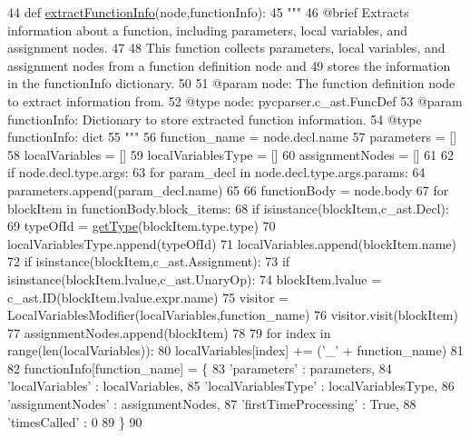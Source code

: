 \begin{DoxyCode}
44 \textcolor{keyword}{def }\hyperlink{namespaceutils_a01c8b36149daaab35946bf42cf90fcc1}{extractFunctionInfo}(node,functionInfo):
45     \textcolor{stringliteral}{"""
}
46 \textcolor{stringliteral}{    @brief Extracts information about a function, including parameters, local variables, and assignment
       nodes.
}
47 \textcolor{stringliteral}{
}
48 \textcolor{stringliteral}{    This function collects parameters, local variables, and assignment nodes from a function definition
       node and
}
49 \textcolor{stringliteral}{    stores the information in the functionInfo dictionary.
}
50 \textcolor{stringliteral}{
}
51 \textcolor{stringliteral}{    @param node: The function definition node to extract information from.
}
52 \textcolor{stringliteral}{    @type node: pycparser.c\_ast.FuncDef
}
53 \textcolor{stringliteral}{    @param functionInfo: Dictionary to store extracted function information.
}
54 \textcolor{stringliteral}{    @type functionInfo: dict
}
55 \textcolor{stringliteral}{    """}
56     function\_name = node.decl.name
57     parameters = []
58     localVariables = []
59     localVariablesType = []
60     assignmentNodes = []
61 
62     \textcolor{keywordflow}{if} node.decl.type.args:
63         \textcolor{keywordflow}{for} param\_decl \textcolor{keywordflow}{in} node.decl.type.args.params:
64             parameters.append(param\_decl.name)
65     
66     functionBody = node.body
67     \textcolor{keywordflow}{for} blockItem \textcolor{keywordflow}{in} functionBody.block\_items:
68         \textcolor{keywordflow}{if} isinstance(blockItem,c\_ast.Decl):
69             typeOfId = \hyperlink{namespaceutils_a63a441384eb62bbf51329ab7e1b212a6}{getType}(blockItem.type.type)
70             localVariablesType.append(typeOfId)
71             localVariables.append(blockItem.name)
72         \textcolor{keywordflow}{if} isinstance(blockItem,c\_ast.Assignment):
73             \textcolor{keywordflow}{if} isinstance(blockItem.lvalue,c\_ast.UnaryOp):
74                 blockItem.lvalue = c\_ast.ID(blockItem.lvalue.expr.name)
75             visitor = LocalVariablesModifier(localVariables,function\_name)
76             visitor.visit(blockItem)
77             assignmentNodes.append(blockItem)
78     
79     \textcolor{keywordflow}{for} index \textcolor{keywordflow}{in} range(len(localVariables)):
80         localVariables[index] += (\textcolor{stringliteral}{'\_'} + function\_name)
81 
82     functionInfo[function\_name] = \{
83         \textcolor{stringliteral}{'parameters'} : parameters,
84         \textcolor{stringliteral}{'localVariables'} : localVariables,
85         \textcolor{stringliteral}{'localVariablesType'} : localVariablesType,
86         \textcolor{stringliteral}{'assignmentNodes'} : assignmentNodes,
87         \textcolor{stringliteral}{'firstTimeProcessing'} : \textcolor{keyword}{True},
88         \textcolor{stringliteral}{'timesCalled'} : 0
89     \}
90 
\end{DoxyCode}
